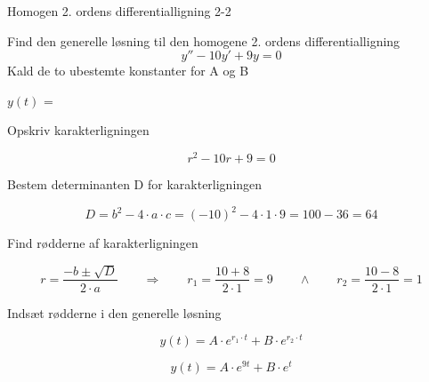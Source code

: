 \documentclass{article}
\begin{document}
\begin{exercise}{Homogen 2. ordens differentialligning 2-2}
	
	Find den generelle løsning til den homogene 2. ordens differentialligning
\[
y'' - 10y' + 9y = 0
\]
Kald de to ubestemte konstanter for A og B

$y(t)$ = 


\hint 

Opskriv karakterligningen

\hint

\[
r^2 -10r + 9 = 0
\]


\hint

Bestem determinanten D for karakterligningen


\hint 
\[
D = b^2 - 4 \cdot a \cdot c = (-10)^2 - 4 \cdot 1 \cdot 9  = 100 - 36 = 64
\]

\hint 
Find rødderne af karakterligningen


\hint

\[
r = \frac{-b \pm \sqrt{D}}{2 \cdot a} \qquad  \Rightarrow \qquad r_1 = \frac{10 + 8}{2 \cdot 1} = 9 \qquad \wedge \qquad r_2 = \frac{10 - 8}{2 \cdot 1} = 1
\]

\hint

Indsæt rødderne i den generelle løsning

\hint
\[
y(t) = A \cdot e^{r_1 \cdot t} + B \cdot e^{r_2\cdot t}
\]

\hint

\[
y(t) = A \cdot e^{9t} + B \cdot e^{t}
\]
	
\end{exercise}

\newpage
\end{document}

